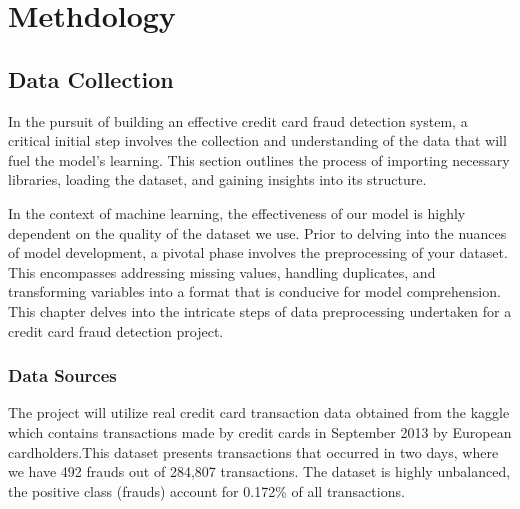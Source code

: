 \let\cleardoublepage\clearpage
\chapter{Methdology} %

\label{Chapter3} %


\newcommand{\keyword}[1]{\textbf{#1}}
\newcommand{\tabhead}[1]{\textbf{#1}}
\newcommand{\code}[1]{\texttt{#1}}
\newcommand{\file}[1]{\texttt{\bfseries#1}}
\newcommand{\option}[1]{\texttt{\itshape#1}}


\section{Data Collection}

In the pursuit of building an effective credit card fraud detection system, a critical initial step involves the collection and understanding of the data that will fuel the model's learning. This section outlines the process of importing necessary libraries, loading the dataset, and gaining insights into its structure.\medskip

In the context of machine learning, the effectiveness of our model is highly dependent on the quality of the dataset we use. Prior to delving into the nuances of model development, a pivotal phase involves the preprocessing of your dataset. This encompasses addressing missing values, handling duplicates, and transforming variables into a format that is conducive for model comprehension. This chapter delves into the intricate steps of data preprocessing undertaken for a credit card fraud detection project.

\subsection{Data Sources}

The project will utilize real credit card transaction data obtained from the kaggle which contains transactions made by credit cards in September 2013 by European cardholders.This dataset presents transactions that occurred in two days, where we have 492 frauds out of 284,807 transactions. The dataset is highly unbalanced, the positive class (frauds) account for 0.172\% of all transactions.\medskip


